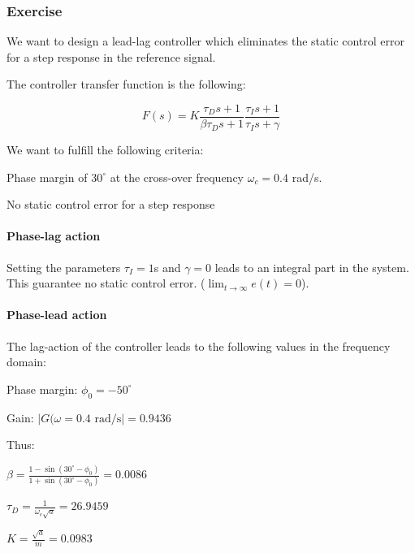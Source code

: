 \subsubsection{Exercise}
\label{exo411}

We want to design a lead-lag controller which eliminates the static control error for a step response in the reference signal.

The controller transfer function is the following:

$$ F(s) = K \frac{\tau_D s + 1}{\beta \tau_D s + 1} \frac{\tau_I s + 1}{\tau_I s + \gamma}$$

We want to fulfill the following criteria:
\begin{shortitemize}
 \item Phase margin of $30^{\circ}$ at the cross-over frequency $\omega_c = 0.4$ rad/s.
 \item No static control error for a step response 
\end{shortitemize}

\paragraph{Phase-lag action}
Setting the parameters $ \tau_I = 1$s and $\gamma = 0$ leads to an integral part in the system. 
This guarantee no static control error. ($\lim_{t\rightarrow\infty} e(t) = 0$).

\paragraph{Phase-lead action}

The lag-action of the controller leads to the following values in the frequency domain:
\begin{shortitemize}
    \item Phase margin: $\phi_0 = -50^{\circ}$
    \item Gain: $|G(\omega = 0.4\text{ rad/s}| = 0.9436$ 
\end{shortitemize}

Thus:

\begin{shortitemize}
    \item $\beta = \frac{1 - \sin(30^{\circ}-\phi_0)}{1 + \sin(30^{\circ} - \phi_0)} = 0.0086$
    \item $\tau_D = \frac{1}{\omega_c \sqrt{a}} = 26.9459$
    \item $K = \frac{\sqrt{a}}{m} = 0.0983$
\end{shortitemize}


